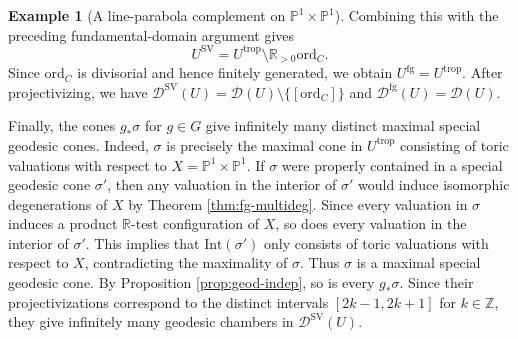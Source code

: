 \documentclass[reqno, 12pt]{amsart}
\theoremstyle{definition}
\newtheorem{expl}[prop]{Example}
\newcommand{\bP}{\mathbb{P}}
\newcommand{\bR}{\mathbb{R}}
\newcommand{\bZ}{\mathbb{Z}}
\newcommand{\cD}{\mathcal{D}}
\newcommand{\ord}{\mathrm{ord}}
\newcommand{\trop}{\mathrm{trop}}
\newcommand{\SV}{\mathrm{SV}}
\newcommand{\Int}{\mathrm{Int}}
\newcommand{\rfg}{\mathrm{fg}}
\numberwithin{equation}{section}
\begin{document}
\begin{expl}[A line-parabola complement on $\bP^1\times\bP^1$]
Combining this with the preceding fundamental-domain argument gives
\[
U^{\SV}
=
U^{\trop}\setminus\bR_{>0}\ord_C.
\]
Since $\ord_C$ is divisorial and hence finitely generated,  we obtain
$U^{\rfg}=U^{\trop}$.
After projectivizing, we have $
\cD^{\SV}(U)=\cD(U)\setminus\{[\ord_C]\}$ and $\cD^{\rfg}(U)=\cD(U)$.

Finally, the cones $g_*\sigma$ for $g\in G$ give infinitely many distinct maximal special geodesic cones. Indeed, $\sigma$ is precisely the maximal
cone in $U^{\trop}$ consisting of toric valuations with respect to
$X=\bP^1\times\bP^1$. If $\sigma$ were properly contained in a special
geodesic cone $\sigma'$, then any  valuation in the interior of $\sigma'$ would induce isomorphic degenerations of $X$ by Theorem \ref{thm:fg-multideg}. Since every valuation in $\sigma$ induces a product $\bR$-test configuration of $X$, so does every valuation 
in the interior of $\sigma'$. This implies that $\Int(\sigma')$ only consists of toric valuations with respect to $X$, contradicting the
maximality of $\sigma$. Thus $\sigma$ is a maximal special geodesic cone.
By Proposition \ref{prop:geod-indep}, so is every $g_*\sigma$. Since their projectivizations
correspond to the distinct intervals
$[2k-1,2k+1]$ for $ k\in\bZ$,
they give infinitely many geodesic chambers in
$\cD^{\SV}(U)$.
\end{expl}
\end{document}
